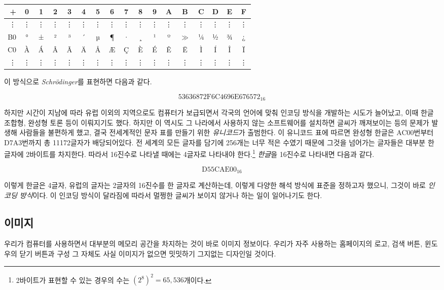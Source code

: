 \documentclass{article}
\begin{document}
\begin{center}
    \begin{tabular}{r|cccccccccccccccc}
        + & 0 & 1 & 2 & 3 & 4 & 5 & 6 & 7 & 8 & 9 & A & B & C & D & E & F \\
        \hline
        \vdots & \vdots & \vdots & \vdots & \vdots & \vdots & \vdots & \vdots & \vdots & \vdots & \vdots & \vdots & \vdots & \vdots & \vdots & \vdots & \vdots \\
        B0 & ° & ± & ² & ³ & ´ & µ & ¶ & · & ¸ & ¹ & º & $\gg$ & ¼ & ½ & ¾ & ¿ \\
        C0 & À & Á & Â & Ã & Ä & Å & Æ & Ç & È & É & Ê & Ë & Ì & Í & Î & Ï \\
        \vdots & \vdots & \vdots & \vdots & \vdots & \vdots & \vdots & \vdots & \vdots & \vdots & \vdots & \vdots & \vdots & \vdots & \vdots & \vdots & \vdots
    \end{tabular}
\end{center}

이 방식으로 \textit{Schrödinger}를 표현하면 다음과 같다.

$$
\text{53636872F6C4696E676572}_{16}
$$

하지만 시간이 지남에 따라 유럽 이외의 지역으로도 컴퓨터가 보급되면서 각국의 언어에 맞춰 인코딩
방식을 개발하는 시도가 늘어났고, 이때 한글 조합형, 완성형 토론 등이 이뤄지기도 했다.
하지만 이 역시도 그 나라에서 사용하지 않는 소프트웨어를 설치하면 글씨가 깨져보이는 등의 문제가
발생해 사람들을 불편하게 했고, 결국 전세계적인 문자 표를 만들기 위한 \textit{유니코드}가 출범한다.
이 유니코드 표에 따르면 완성형 한글은 AC00번부터 D7A3번까지 총 11172글자가 배당되어있다.
전 세계의 모든 글자를 담기에 256개는 너무 적은 수였기 때문에 그것을 넘어가는 글자들은 대부분
한 글자에 2바이트를 차지한다. 따라서 16진수로 나타낼 때에는 4글자로 나타내야
한다.\footnote{2바이트가 표현할 수 있는 경우의 수는 $(2^8)^2 = 65,536$개이다.}
\textit{한글}을 16진수로 나타내면 다음과 같다.

$$
\text{D55CAE00}_{16}
$$

이렇게 한글은 4글자, 유럽의 글자는 2글자의 16진수를 한 글자로 계산하는데, 이렇게 다양한
해석 방식에 표준을 정하고자 했으니, 그것이 바로 \textit{인코딩 방식}이다. 이 인코딩 방식이 달라짐에
따라서 멀쩡한 글씨가 보이지 않거나 하는 일이 일어나기도 한다.

\subsection{이미지}

우리가 컴퓨터를 사용하면서 대부분의 메모리 공간을 차지하는 것이 바로 이미지 정보이다.
우리가 자주 사용하는 홈페이지의 로고, 검색 버튼, 윈도우의 닫기 버튼과 구성 그 자체도
사실 이미지가 없으면 밋밋하기 그지없는 디자인일 것이다.
\end{document}
